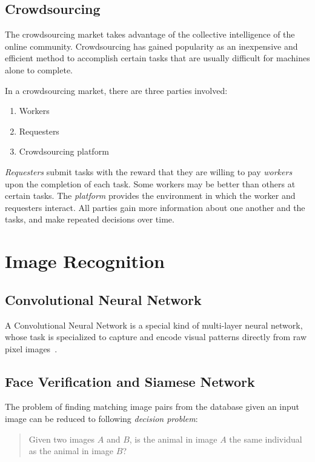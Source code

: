   \subsection{Crowdsourcing}

  The crowdsourcing market takes advantage of the collective intelligence
  of the online community. Crowdsourcing has gained popularity as an inexpensive
  and efficient method to accomplish certain tasks that are usually difficult for
  machines alone to complete.

  In a crowdsourcing market, there are three parties involved:
  \begin{enumerate}
  	\item Workers
  	\item Requesters
  	\item Crowdsourcing platform
  \end{enumerate}

  \emph{Requesters} submit tasks with the reward that they are
  willing to pay \emph{workers} upon the completion of each task. Some workers
  may be better than others at certain tasks. The \emph{platform} provides the
  environment in which the worker and requesters interact. All parties gain more
  information about one another and the tasks, and make repeated decisions
  over time.


\section{Image Recognition}

  \subsection{Convolutional Neural Network}

  A Convolutional Neural Network is a special kind of multi-layer neural network,
  whose task is specialized to capture and encode visual patterns directly from
  raw pixel images~\cite{lecun95}.

  \subsection{Face Verification and Siamese Network}

  The problem of finding matching image pairs from the database given an input
  image can be reduced to following \emph{decision problem}:
  \begin{quote}
  \centering
  Given two images $A$ and $B$, is the animal in image $A$ the same individual as the
  animal in image $B$?
  \end{quote}

